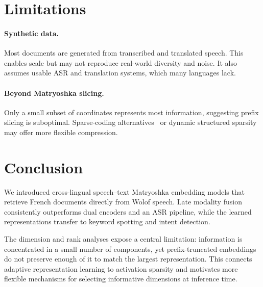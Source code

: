 \section{Limitations}

\paragraph{Synthetic data.}
Most documents are generated from transcribed and translated speech. This enables scale but may not reproduce real-world diversity and noise. It also assumes usable ASR and translation systems, which many languages lack.

\paragraph{Beyond Matryoshka slicing.}
Only a small subset of coordinates represents most information, suggesting prefix slicing is suboptimal. Sparse-coding alternatives~\citep{wen2025matryoshkarevisitingsparsecoding} or dynamic structured sparsity may offer more flexible compression.

\section{Conclusion}
We introduced cross-lingual speech--text Matryoshka embedding models that retrieve French documents directly from Wolof speech. Late modality fusion consistently outperforms dual encoders and an ASR pipeline, while the learned representations transfer to keyword spotting and intent detection.

The dimension and rank analyses expose a central limitation: information is concentrated in a small number of components, yet prefix-truncated embeddings do not preserve enough of it to match the largest representation. This connects adaptive representation learning to activation sparsity and motivates more flexible mechanisms for selecting informative dimensions at inference time.
